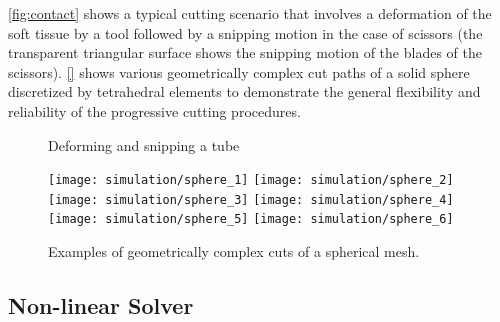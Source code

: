 \autoref{fig:contact} shows a typical cutting scenario that involves a deformation of the soft tissue by a tool followed by a snipping motion in the case of scissors (the transparent triangular surface shows the snipping motion of the blades of the scissors).
\autoref{} shows various geometrically complex cut paths of a solid sphere discretized by tetrahedral elements to demonstrate the general flexibility and reliability of the progressive cutting procedures.
\begin{figure}
  \centering%
  \setlength{\fboxsep}{0pt}%
  \setlength{\fboxrule}{0.1pt}%
  \caption{Deforming and snipping a tube}\label{fig:contact}
\end{figure}

\begin{figure}
  \centering%
	\texttt{[image: simulation/sphere\_1]}\hfill%
	\texttt{[image: simulation/sphere\_2]}\\[1.5ex]
	\texttt{[image: simulation/sphere\_3]}\hfill%
	\texttt{[image: simulation/sphere\_4]}\\[1.5ex]
	\texttt{[image: simulation/sphere\_5]}\hfill%
	\texttt{[image: simulation/sphere\_6]}\\
	\caption{Examples of geometrically complex cuts of a spherical mesh.}\label{fig:sphere}
\end{figure}






\subsection{Non-linear Solver}\label{ssec:nonlinear_solver}

